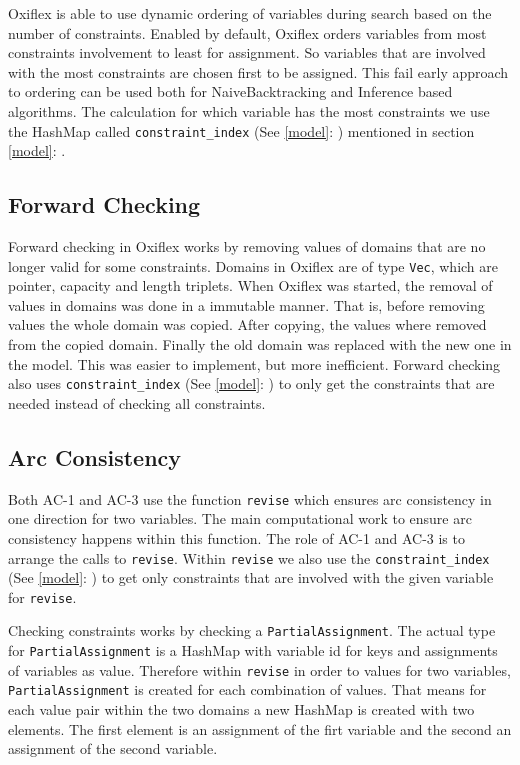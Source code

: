 Oxiflex is able to use dynamic ordering of variables during search based on the number of constraints. Enabled by default, Oxiflex orders variables from most constraints involvement to least for assignment. So variables that are involved with the most constraints are chosen first to be assigned. This fail early approach to ordering can be used both for NaiveBacktracking and Inference based algorithms. The calculation for which variable has the most constraints we use the HashMap called \verb|constraint_index| (See \ref{model}: ) mentioned in section \ref{model}: .

\subsection{Forward Checking}

Forward checking in Oxiflex works by removing values of domains that are no longer valid for some constraints. Domains in Oxiflex are of type \verb|Vec|, which are pointer, capacity and length triplets. When Oxiflex was started, the removal of values in domains was done in a immutable manner. That is, before removing values the whole domain was copied. After copying, the values where removed from the copied domain. Finally the old domain was replaced with the new one in the model. This was easier to implement, but more inefficient. Forward checking also uses \verb|constraint_index| (See \ref{model}: ) to only get the constraints that are needed instead of checking all constraints.

\subsection{Arc Consistency}

Both AC-1 and AC-3 use the function \verb|revise| which ensures arc consistency in one direction for two variables. The main computational work to ensure arc consistency happens within this function. The role of AC-1 and AC-3 is to arrange the calls to \verb|revise|. Within \verb|revise| we also use the \verb|constraint_index| (See \ref{model}: ) to get only constraints that are involved with the given variable for \verb|revise|.

Checking constraints works by checking a \verb|PartialAssignment|. The actual type for \verb|PartialAssignment| is a HashMap with variable id for keys and assignments of variables as value. Therefore within \verb|revise| in order to values for two variables, \verb|PartialAssignment| is created for each combination of values. That means for each value pair within the two domains a new HashMap is created with two elements. The first element is an assignment of the firt variable and the second an assignment of the second variable.
